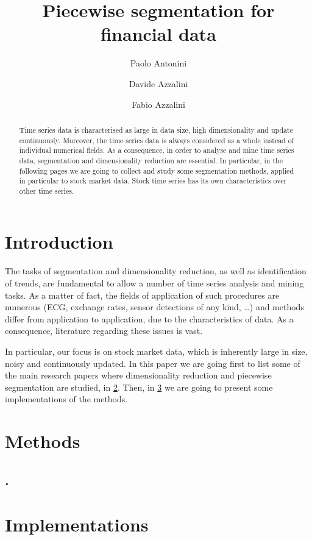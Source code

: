\documentclass[a4paper]{article}
\title{Piecewise segmentation for financial data}
\author{Paolo Antonini \and Davide Azzalini \and Fabio Azzalini}
\date{}
\begin{document}
\maketitle

\begin{abstract}
Time series data is characterised as large in data size, high dimensionality and update continuously. Moreover, the time series data is always considered as a whole instead of individual numerical fields. As a consequence, in order to analyse and mine time series data, segmentation and dimensionality reduction are essential. In particular, in the following pages we are going to collect and study some segmentation methods, applied in particular to stock market data. Stock time series has its own characteristics over other time series. 
\end{abstract}

\section{Introduction}
The tasks of segmentation and dimensionality reduction, as well as identification of trends, are fundamental to allow a number of time series analysis and mining tasks. As a matter of fact, the fields of application of such procedures are numerous (ECG, exchange rates, sensor detections of any kind, \dots) and methods differ from application to application, due to the characteristics of data. As a consequence, literature regarding these issues is vast. 

In particular, our focus is on stock market data, which is inherently large in size, noisy and continuously updated. In this paper we are going first to list some of the main research papers where dimensionality reduction and piecewise segmentation are studied, in \cref{sec:methods}. Then, in \cref{sec:implementations} we are going to present some implementations of the methods. 


\section{Methods}\label{sec:methods}

\lipsum[1]

\subsection{\citeauthor{5961935}. }
\lipsum[2-3]


\section{Implementations}\label{sec:implementations}
\end{document}
